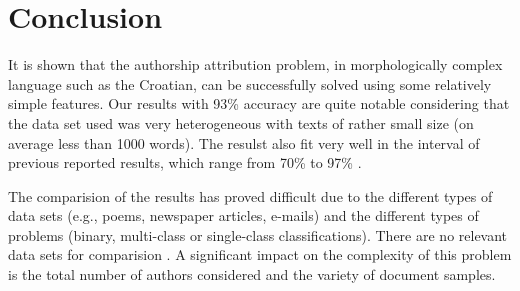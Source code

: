 \documentclass{llncs}
\begin{document}

% 
% 

\section{Conclusion}
It is shown that the authorship attribution problem, in morphologically complex
language such as the Croatian, can be successfully solved using some relatively
simple features. Our results with 93\% accuracy are quite notable considering
that the data set used was very heterogeneous with texts of rather small
size (on average less than 1000 words). The resulst also fit very well in the
interval of previous reported results, which range from 70\% to 97\% \cite{coyotl2006authorship,keselj2003n,luyckx2005shallow,stamatatos2001computer}.

The comparision of the results has proved difficult due to the different types of
data sets (e.g., poems, newspaper articles, e-mails) and the different types of
problems (binary, multi-class or single-class classifications). There are no
relevant data sets for comparision \cite{zhao2005effective}. A significant impact
on the complexity of this problem is the total number of authors considered and
the variety of document samples.
\end{document}
